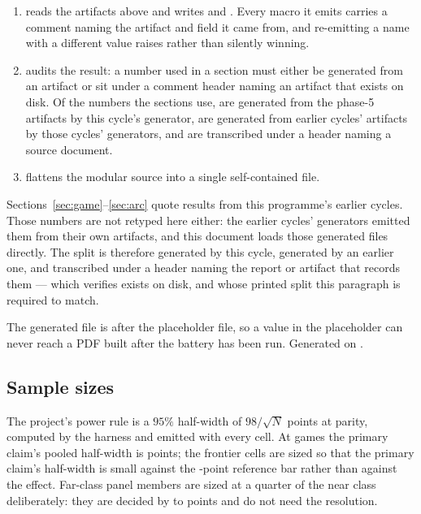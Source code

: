 \begin{enumerate}
\item {} reads the artifacts above and writes
   and . Every macro it
  emits carries a comment naming the artifact and field it came from, and re-emitting a name with a
  different value raises rather than silently winning.
\item {} audits the result: a number used in a section
  must either be generated from an artifact or sit under a comment header naming an artifact that
  exists on disk. Of the numbers the sections use, \vsevenProvGenerated{} are generated from the phase-5 artifacts by
  this cycle's generator, \vsevenProvInherited{} are generated from earlier cycles' artifacts by
  those cycles' generators, and \vsevenProvTranscribed{} are transcribed under a header naming a
  source document.
\item {} flattens the modular source into a single self-contained file.
\end{enumerate}

Sections~\ref{sec:game}--\ref{sec:arc} quote results from this programme's earlier cycles. Those
numbers are not retyped here either: the earlier cycles' generators emitted them from their own
artifacts, and this document loads those generated files directly. The split is therefore \vsevenProvGenerated{} generated by this cycle,
\vsevenProvInherited{} generated by an earlier one, and \vsevenProvTranscribed{} transcribed under a
header naming the report or artifact that records them --- which
 verifies exists on disk, and whose printed split this
paragraph is required to match.

The generated file is \verb|| after the placeholder file, so a value in the placeholder can never
reach a PDF built after the battery has been run. Generated on \vsevenBuildDate{}.

\subsection*{Sample sizes}

The project's power rule is a $95\%$ half-width of $98/\sqrt{N}$ points at parity, computed by the
harness and emitted with every cell. At \vsevenBtwoFcheapN{} games the primary claim's pooled half-width is
\vsevenBtwoFcheapHalfWidth{} points; the
frontier cells are sized so that the primary claim's half-width is small against the
\vsevenPrimaryFloor{}-point reference bar rather than against the effect. Far-class panel members are
sized at a quarter of the near class deliberately: they are decided by \vsevenFarSpanLo{} to \vsevenFarSpanHi{} points
and do not need the resolution.
